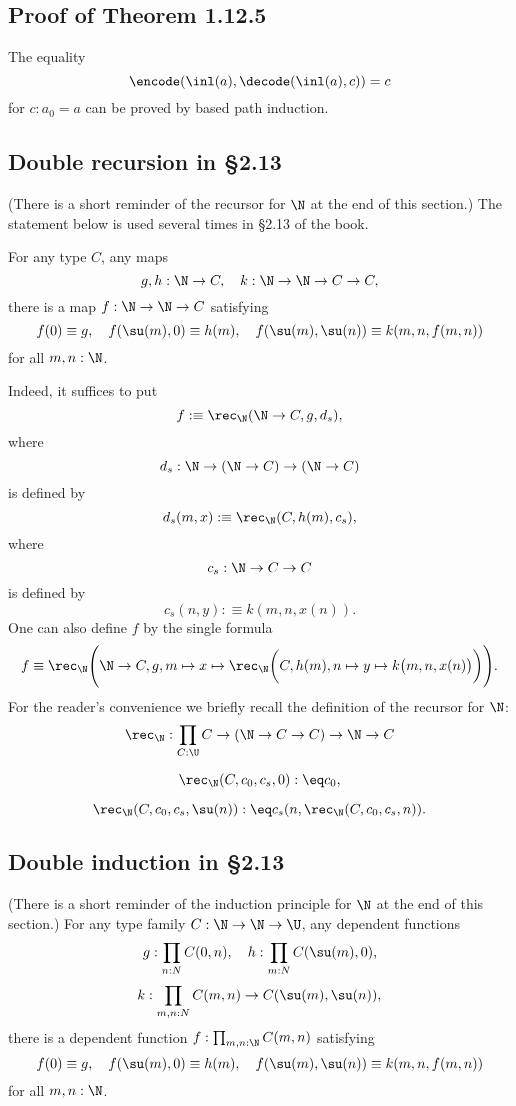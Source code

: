\documentclass[12pt]{article}
\begin{document}

\subsection{Proof of Theorem 1.12.5}

The equality 
$$
\encode(\inl(a),\decode(\inl(a),c))=c
$$ 
for $c:a_0=a$ can be proved by based path induction.


\subsection{Double recursion in \S2.13}

(There is a short reminder of the recursor for $\N$ at the end of this section.) The statement below is used several times in \S2.13 of the book.

For any type $C$, any maps 
$$
g,h:\N\to C,\quad k:\N\to\N\to C\to C,
$$ 
there is a map $f:\N\to\N\to C$ satisfying 
$$
f(0)\equiv g,\quad f(\su(m),0)\equiv h(m),\quad f(\su(m),\su(n))\equiv k(m,n,f(m,n))
$$ 
for all $m,n:\N$.

Indeed, it suffices to put 
$$
f:\equiv\rec_\N(\N\to C,g,d_s),
$$ 
where 
$$
d_s:\N\to(\N\to C)\to(\N\to C)
$$ 
is defined by 
$$
d_s(m,x):\equiv\rec_\N(C,h(m),c_s),
$$ 
where 
$$
c_s:\N\to C\to C
$$ 
is defined by 
$$
c_s(n,y):\equiv k(m,n,x(n)).
$$ 
One can also define $f$ by the single formula
$$
f\equiv\rec_\N\Bigg(\N\to C,g,m\mapsto x\mapsto\rec_\N\bigg(C,h(m),n\mapsto y\mapsto k\big(m,n,x(n)\big)\bigg)\Bigg).
$$ 
For the reader's convenience we briefly recall the definition of the recursor for $\N$:
$$\rec_\N:\prod_{C:\U}C\to(\N\to C\to C)\to\N\to C$$

$$\rec_\N(C,c_0,c_s,0):\eq c_0,$$

$$\rec_\N(C,c_0,c_s,\su(n)):\eq c_s(n,\rec_\N(C,c_0,c_s,n)).$$


\subsection{Double induction in \S2.13}

(There is a short reminder of the induction principle for $\N$ at the end of this section.) For any type family $C:\N\to\N\to\U$, any dependent functions
$$
g:\prod_{n:N}C(0,n),\quad h:\prod_{m:N}C(\su(m),0),
$$
$$
k:\prod_{m,n:N}C(m,n)\to C(\su(m),\su(n)),
$$ 
there is a dependent function $f:\prod_{m,n:\N}C(m,n)$ satisfying 
$$
f(0)\equiv g,\quad f(\su(m),0)\equiv h(m),\quad f(\su(m),\su(n))\equiv k(m,n,f(m,n))
$$ 
for all $m,n:\N$.
\end{document}
